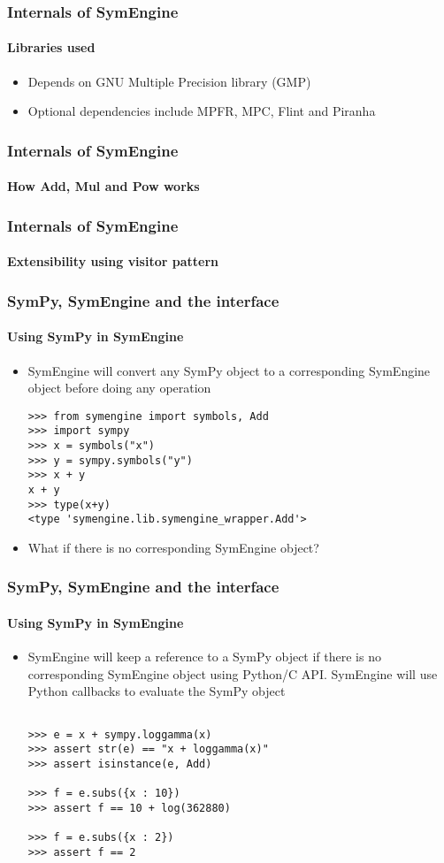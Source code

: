 \documentclass{beamer}
\begin{document}
\begin{frame}
\frametitle{Internals of SymEngine}
\framesubtitle{Libraries used}
\begin{itemize}
\item Depends on GNU Multiple Precision library (GMP)
\item Optional dependencies include MPFR, MPC, Flint and Piranha
\end{itemize}
\end{frame}


\begin{frame}
\frametitle{Internals of SymEngine}
\framesubtitle{How Add, Mul and Pow works}
\end{frame}


\begin{frame}
\frametitle{Internals of SymEngine}
\framesubtitle{Extensibility using visitor pattern}
\end{frame}


\begin{frame}[fragile]
\frametitle{SymPy, SymEngine and the interface}
\framesubtitle{Using SymPy in SymEngine}
\begin{itemize}
\item
SymEngine will convert any SymPy object to a corresponding SymEngine object before doing any operation

\begin{verbatim}
>>> from symengine import symbols, Add
>>> import sympy
>>> x = symbols("x")
>>> y = sympy.symbols("y")
>>> x + y
x + y
>>> type(x+y)
<type 'symengine.lib.symengine_wrapper.Add'>
\end{verbatim}
\item
What if there is no corresponding SymEngine object?
\end{itemize}
\end{frame}


\begin{frame}[fragile]
\frametitle{SymPy, SymEngine and the interface}
\framesubtitle{Using SymPy in SymEngine}
\begin{itemize}
\item
SymEngine will keep a reference to a SymPy object if there is no corresponding SymEngine object using Python/C API.
SymEngine will use Python callbacks to evaluate the SymPy object

\begin{verbatim}

>>> e = x + sympy.loggamma(x)
>>> assert str(e) == "x + loggamma(x)"
>>> assert isinstance(e, Add)

>>> f = e.subs({x : 10})
>>> assert f == 10 + log(362880)

>>> f = e.subs({x : 2})
>>> assert f == 2
\end{verbatim}
\end{itemize}
\end{frame}
\end{document}
